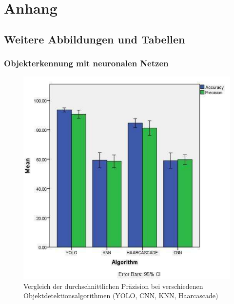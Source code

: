 \chapter{Anhang}
\section{Weitere Abbildungen und Tabellen}
\subsection{Objekterkennung mit neuronalen Netzen}{


    
\begin{figure}[h]
    \centering
    \includegraphics*[scale = 0.5, keepaspectratio]{images/yolo_comp/yolo_mean_prec.png}
    \caption[Vergleich der durchschnittlichen Präzision bei verschiedenen Objektdetektionsalgorithmen (YOLO, CNN, KNN, Haarcascade) ]{Vergleich der durchschnittlichen Präzision bei verschiedenen Objektdetektionsalgorithmen (YOLO, CNN, KNN, Haarcascade) \citep{Pavani2022}}
    \label{scr:comp_obj_det_mean_av}
 \end{figure}
 \begin{figure}[ht]
    \centering
    \begin{subfigure}[b]{0.45\textwidth}
        \centering

\end{subfigure}
\end{figure}}
